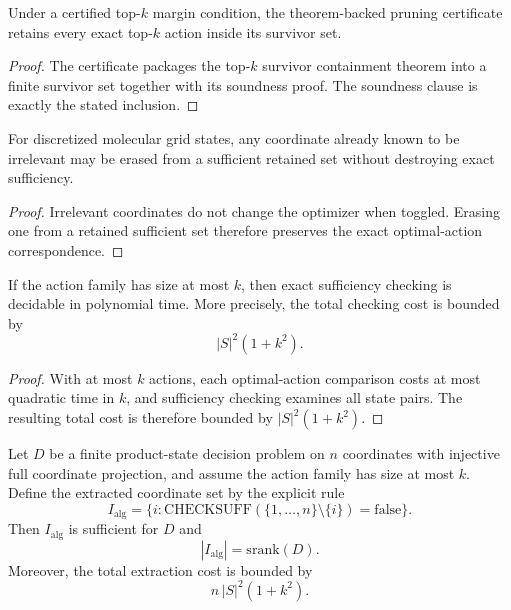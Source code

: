 \begin{theorem}\label{thm:topk-certificate-sound}
Under a certified top-$k$ margin condition, the theorem-backed pruning certificate retains every exact top-$k$ action inside its survivor set.
\end{theorem}

\begin{proof}
The certificate packages the top-$k$ survivor containment theorem into a finite survivor set together with its soundness proof. The soundness clause is exactly the stated inclusion.
\end{proof}

\begin{theorem}\label{thm:grid-erase-irrelevant}
For discretized molecular grid states, any coordinate already known to be irrelevant may be erased from a sufficient retained set without destroying exact sufficiency.
\end{theorem}

\begin{proof}
Irrelevant coordinates do not change the optimizer when toggled. Erasing one from a retained sufficient set therefore preserves the exact optimal-action correspondence.
\end{proof}

\begin{theorem}\label{thm:bounded-actions-poly}
If the action family has size at most $k$, then exact sufficiency checking is decidable in polynomial time. More precisely, the total checking cost is bounded by
\[
|S|^2 (1 + k^2).
\]
\end{theorem}

\begin{proof}
With at most $k$ actions, each optimal-action comparison costs at most quadratic time in $k$, and sufficiency checking examines all state pairs. The resulting total cost is therefore bounded by $|S|^2(1+k^2)$.
\end{proof}

\begin{theorem}\label{thm:coordinate-extraction-poly}
Let $D$ be a finite product-state decision problem on $n$ coordinates with injective full coordinate projection, and assume the action family has size at most $k$. Define the extracted coordinate set by the explicit rule
\[
I_{\mathrm{alg}}
=
\bigl\{i : \mathrm{CHECKSUFF}(\{1,\dots,n\}\setminus\{i\}) = \mathrm{false}\bigr\}.
\]
Then $I_{\mathrm{alg}}$ is sufficient for $D$ and
\[
|I_{\mathrm{alg}}| = \mathrm{srank}(D).
\]
Moreover, the total extraction cost is bounded by
\[
n\,|S|^2(1+k^2).
\]
\end{theorem}

